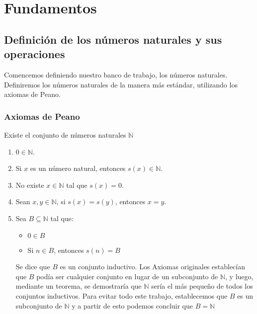 \documentclass{report}
\begin{document}
    \tableofcontents

    \pagebreak
    \chapter{Fundamentos}

    \section{Definición de los números naturales y sus operaciones}
    Comencemos definiendo nuestro banco de trabajo, los números naturales. Definiremos los números naturales de la manera más estándar, utilizando los axiomas de Peano.

    \subsection*{Axiomas de Peano}
    Existe el conjunto de números naturales $\mathbb{N}$
    \begin{enumerate}
        \item $0 \in \mathbb{N}$.
        \item Si $x$ es un número natural, entonces $s(x)\in \mathbb{N}$.
        \item No existe $x \in \mathbb{N}$ tal que $s(x) = 0$.
        \item Sean $x,y \in \mathbb{N}$, si $s(x) = s(y)$, entonces $x=y$.
        \item Sea $B \subseteq \mathbb{N}$ tal que:
            \begin{itemize}
                \item $0 \in B$
                \item Si $n\in B$, entonces $s(n)=B$
            \end{itemize}
        \begin{noteBox}
            Se dice que $B$ es un conjunto inductivo. Los Axiomas originales establecían que $B$ podía ser cualquier conjunto en lugar de un subconjunto de $\mathbb{N}$, y luego, mediante un teorema, se demostraría que $\mathbb{N}$ sería el más pequeño de todos los conjuntos inductivos. Para evitar todo este trabajo,  establecemos que $B$ es un subconjunto de $\mathbb{N}$ y a partir de esto podemos concluir que $B = \mathbb{N}$
        \end{noteBox}
    \end{enumerate}
\end{document}
